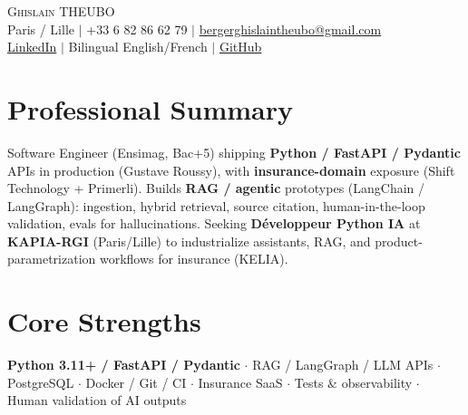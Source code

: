 \documentclass[letterpaper,10.5pt]{article}
\begin{document}
\begin{center}
{\Huge \scshape Ghislain THEUBO} \\ \vspace{2pt}
\small Paris / Lille $|$ +33 6 82 86 62 79 $|$ \href{mailto:bergerghislaintheubo@gmail.com}{bergerghislaintheubo@gmail.com} \\
\href{https://www.linkedin.com/in/berger-ghislain}{LinkedIn} $|$ Bilingual English/French $|$ \href{https://github.com/Bergerghislain}{GitHub}
\end{center}
\vspace{-6pt}
\section{Professional Summary}
\small{Software Engineer (Ensimag, Bac+5) shipping \textbf{Python / FastAPI / Pydantic} APIs in production (Gustave Roussy), with \textbf{insurance-domain} exposure (Shift Technology + Primerli). Builds \textbf{RAG / agentic} prototypes (LangChain / LangGraph): ingestion, hybrid retrieval, source citation, human-in-the-loop validation, evals for hallucinations. Seeking \textbf{D\'eveloppeur Python IA} at \textbf{KAPIA-RGI} (Paris/Lille) to industrialize assistants, RAG, and product-parametrization workflows for insurance (KELIA).}
\section{Core Strengths}
\small{\textbf{Python 3.11+ / FastAPI / Pydantic} $\cdot$ RAG / LangGraph / LLM APIs $\cdot$ PostgreSQL $\cdot$ Docker / Git / CI $\cdot$ Insurance SaaS $\cdot$ Tests \& observability $\cdot$ Human validation of AI outputs}
\end{document}
